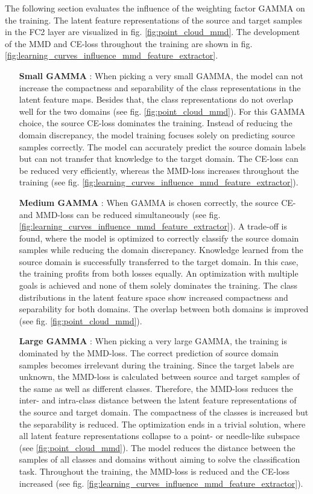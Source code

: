 The following section evaluates the influence of the weighting factor GAMMA on the training. The latent feature representations of the source and target samples in the FC2 layer are visualized in fig. \ref{fig:point_cloud_mmd}. The development of the MMD and CE-loss throughout the training are shown in fig. \ref{fig:learning_curves_influence_mmd_feature_extractor}.
\begin{itemize}
    \item [\textbf{Small GAMMA}]:
    When picking a very small GAMMA, the model can not increase the compactness and separability of the class representations in the latent feature maps. Besides that, the class representations do not overlap well for the two domains (see fig. \ref{fig:point_cloud_mmd}). For this GAMMA choice, the source CE-loss dominates the training. Instead of reducing the domain discrepancy, the model training focuses solely on predicting source samples correctly. The model can accurately predict the source domain labels but can not transfer that knowledge to the target domain. The CE-loss can be reduced very efficiently, whereas the MMD-loss increases throughout the training (see fig. \ref{fig:learning_curves_influence_mmd_feature_extractor}).
    \item [\textbf{Medium GAMMA}]:
    When GAMMA is chosen correctly, the source CE- and MMD-loss can be reduced simultaneously (see fig. \ref{fig:learning_curves_influence_mmd_feature_extractor}). A trade-off is found, where the model is optimized to correctly classify the source domain samples while reducing the domain discrepancy. Knowledge learned from the source domain is successfully transferred to the target domain. In this case, the training profits from both losses equally. An optimization with multiple goals is achieved and none of them solely dominates the training. The class distributions in the latent feature space show increased compactness and separability for both domains. The overlap between both domains is improved (see fig. \ref{fig:point_cloud_mmd}).
    \item [\textbf{Large GAMMA}]:
    When picking a very large GAMMA, the training is dominated by the MMD-loss. The correct prediction of source domain samples becomes irrelevant during the training. Since the target labels are unknown, the MMD-loss is calculated between source and target samples of the same as well as different classes. Therefore, the MMD-loss reduces the inter- and intra-class distance between the latent feature representations of the source and target domain. The compactness of the classes is increased but the separability is reduced. The optimization ends in a trivial solution, where all latent feature representations collapse to a point- or needle-like subspace (see \ref{fig:point_cloud_mmd}). The model reduces the distance between the samples of all classes and domains without aiming to solve the classification task. Throughout the training, the MMD-loss is reduced and the CE-loss increased (see fig. \ref{fig:learning_curves_influence_mmd_feature_extractor}).
\end{itemize}

